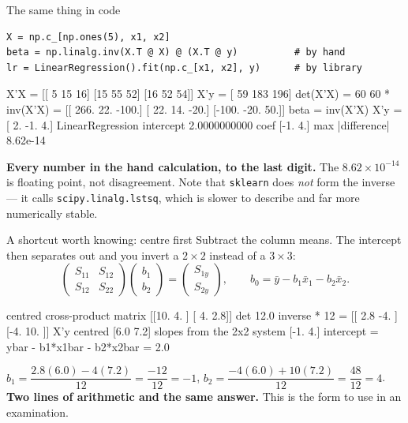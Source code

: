 \documentclass[aspectratio=169]{beamer}
\begin{document}
\begin{frame}[fragile,shrink=6]{The same thing in code}
\begin{lstlisting}
X = np.c_[np.ones(5), x1, x2]
beta = np.linalg.inv(X.T @ X) @ (X.T @ y)          # by hand
lr = LinearRegression().fit(np.c_[x1, x2], y)      # by library
\end{lstlisting}
\begin{outblk}
X'X =
 [[ 5 15 16]
 [15 55 52]
 [16 52 54]]
X'y = [ 59 183 196]
det(X'X) = 60
60 * inv(X'X) =
 [[ 266.   22. -100.]
 [  22.   14.  -20.]
 [-100.  -20.   50.]]
beta = inv(X'X) X'y = [ 2. -1.  4.]
LinearRegression intercept 2.0000000000  coef [-1.  4.]
max |difference| 8.62e-14
\end{outblk}
\begin{center}\small
  \textbf{Every number in the hand calculation, to the last digit.} The
  $8.62\times10^{-14}$ is floating point, not disagreement. Note that
  \texttt{sklearn} does \emph{not} form the inverse --- it calls
  \texttt{scipy.linalg.lstsq}, which is slower to describe and far more
  numerically stable.
\end{center}
\end{frame}

\begin{frame}[fragile,shrink=8]{A shortcut worth knowing: centre first}
Subtract the column means. The intercept then separates out and you invert a
$2\times2$ instead of a $3\times3$:
\[
  \begin{pmatrix} S_{11} & S_{12}\\ S_{12} & S_{22}\end{pmatrix}
  \begin{pmatrix} b_1\\ b_2\end{pmatrix}
  = \begin{pmatrix} S_{1y}\\ S_{2y}\end{pmatrix},
  \qquad
  b_0 = \bar y - b_1\bar x_1 - b_2\bar x_2 .
\]
\begin{outblk}
centred cross-product matrix
 [[10.   4. ]
 [ 4.   2.8]]
det 12.0   inverse * 12 =
 [[ 2.8 -4. ]
 [-4.  10. ]]
X'y centred       [6.0 7.2]
slopes from the 2x2 system [-1.  4.]
intercept = ybar - b1*x1bar - b2*x2bar = 2.0
\end{outblk}
\begin{center}\small
  $b_1 = \dfrac{2.8(6.0) - 4(7.2)}{12} = \dfrac{-12}{12} = -1$,\quad
  $b_2 = \dfrac{-4(6.0) + 10(7.2)}{12} = \dfrac{48}{12} = 4$.
  \textbf{Two lines of arithmetic and the same answer.} This is the form to
  use in an examination.
\end{center}
\end{frame}
\end{document}
